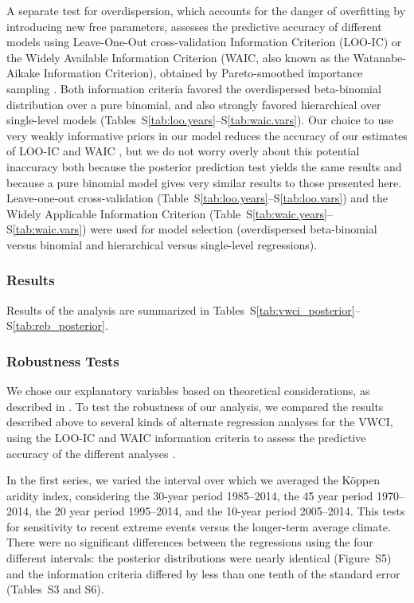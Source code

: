 \documentclass[draft]{agujournal}\usepackage{knitr}
\begin{document}
A separate test for overdispersion, which accounts for the danger of overfitting
by introducing new free parameters, assesses the predictive accuracy of different
models using
Leave-One-Out cross-validation Information Criterion (LOO-IC)
or the
Widely Available Information Criterion (WAIC, also known as the
Watanabe-Aikake Information Criterion),
obtained by Pareto-smoothed importance sampling \citep{gelman:predictive:2014,vehtari:loo:2016}.
Both information criteria favored the overdispersed beta-binomial distribution
over a pure binomial, and also strongly favored hierarchical over single-level
models (Tables~S\ref{tab:loo.years}--S\ref{tab:waic.vars}).
Our choice to use very weakly informative priors in our model reduces the
accuracy of our estimates of LOO-IC and WAIC \citep{vehtari:loo:2016},
but we do not worry overly about this potential inaccuracy both because the
posterior prediction test yields the same results and because a pure binomial
model gives very similar results to those presented here.
\else
Leave-one-out cross-validation (Table~S\ref{tab:loo.years}--S\ref{tab:loo.vars})
and the Widely Applicable Information Criterion
(Table~S\ref{tab:waic.years}--S\ref{tab:waic.vars}) were used for model selection
(overdispersed beta-binomial versus binomial and hierarchical versus single-level
regressions).
\fi

\subsubsection*{Results}

Results of the analysis are summarized in
Tables~S\ref{tab:vwci_posterior}--S\ref{tab:reb_posterior}.

\subsubsection*{Robustness Tests}
We chose our explanatory variables based on theoretical considerations, as
described in \citet{hess:drought:2016}. To test the robustness of our analysis,
we compared the results described above to several kinds of alternate regression
analyses for the VWCI, using the LOO-IC and WAIC information criteria to
assess the predictive accuracy of the different analyses
\citep{gelman:predictive:2014,vehtari:loo:2016}.

In the first series, we varied the interval over which we averaged
the K\"oppen aridity index, considering the 30-year period 1985--2014,
the 45 year period 1970--2014,
the 20 year period 1995--2014, and the 10-year period 2005--2014. This tests
for sensitivity to recent extreme events versus the longer-term average
climate.
There were no significant differences between the regressions using the
four different intervals: the posterior distributions were nearly identical
(Figure~S5) and the information criteria differed by less than one tenth
of the standard error (Tables~S3 and S6).
\end{document}

